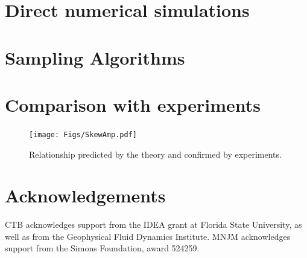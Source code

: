 \documentclass[11pt]{article}
\newcommand{\vsp}[1]{\vspace{#1 pc} \noindent}
\begin{document}
\vsp{10}
\section{Direct numerical simulations}

\section{Sampling Algorithms}


\section{Comparison with experiments}

\begin{figure}%
\begin{center}
\texttt{[image: Figs/SkewAmp.pdf]}
\caption{
Relationship predicted by the theory and confirmed by experiments.
}
\label{AAA}
\end{center}
\end{figure}

\section*{Acknowledgements}
CTB acknowledges support from the IDEA grant at Florida State University, as well as from the Geophysical Fluid Dynamics Institute. 
MNJM acknowledges support from the Simons Foundation, award 524259. 



\end{document}
